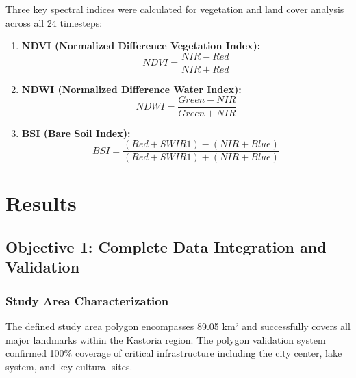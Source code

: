 \documentclass[a4paper,12pt]{article}
\begin{document}
Three key spectral indices were calculated for vegetation and land cover
analysis across all 24 timesteps:

\begin{enumerate}
    \item \textbf{NDVI (Normalized Difference Vegetation Index):}
          \begin{equation}
              NDVI = \frac{NIR - Red}{NIR + Red}
          \end{equation}

    \item \textbf{NDWI (Normalized Difference Water Index):}
          \begin{equation}
              NDWI = \frac{Green - NIR}{Green + NIR}
          \end{equation}

    \item \textbf{BSI (Bare Soil Index):}
          \begin{equation}
              BSI = \frac{(Red + SWIR1) - (NIR + Blue)}{(Red + SWIR1) + (NIR + Blue)}
          \end{equation}
\end{enumerate}

\section{Results}

\subsection{Objective 1: Complete Data Integration and Validation}

\subsubsection{Study Area Characterization}

The defined study area polygon encompasses 89.05 km² and successfully covers all
major landmarks within the Kastoria region. The polygon validation system
confirmed 100\% coverage of critical infrastructure including the city center,
lake system, and key cultural sites.
\end{document}
